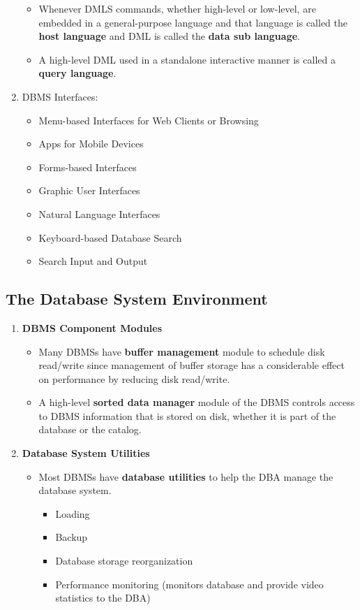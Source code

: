 \documentclass[10pt]{article}
\newcommand{\tf}{\textbf}
\begin{document}
\begin{enumerate}
\begin{itemize}
		\item Whenever DMLS commands, whether high-level or low-level, are embedded in a general-purpose language and that language is called the \tf{host language} and DML is called the \tf{data sub language}.
		\item A high-level DML used in a standalone interactive manner is called a \tf{query language}.
	\end{itemize}

	\item DBMS Interfaces:
	\begin{itemize}
		\item Menu-based Interfaces for Web Clients or Browsing
		\item Apps for Mobile Devices
		\item Forms-based Interfaces
		\item Graphic User Interfaces
		\item Natural Language Interfaces
		\item Keyboard-based Database Search
		\item Search Input and Output
	\end{itemize}
\end{enumerate}

\subsection{The Database System Environment}
\begin{enumerate}
	\item \tf{DBMS Component Modules}
	\begin{itemize}
		\item Many DBMSs have \tf{buffer management} module to schedule disk read/write since management of buffer storage has a considerable effect on performance by reducing disk read/write.
		\item A high-level \tf{sorted data manager} module of the DBMS controls access to DBMS information that is stored on disk, whether it is part of the database or the catalog.
	\end{itemize}

	\item \tf{Database System Utilities}
	\begin{itemize}
		\item Most DBMSs have \tf{database utilities} to help the DBA manage the database system.
		\begin{itemize}
			\item Loading
			\item Backup
			\item Database storage reorganization
			\item Performance monitoring (monitors database and provide video statistics to the DBA)
		\end{itemize} 
	\end{itemize}
\end{enumerate}
\end{document}
